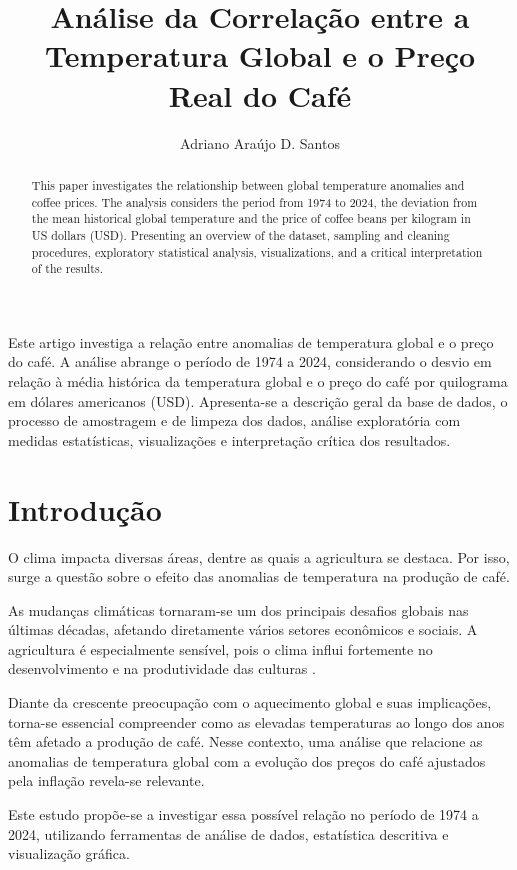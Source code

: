 \documentclass[12pt]{article}
\title{Análise da Correlação entre a Temperatura Global e o Preço Real do Café}
\author{Adriano Araújo D. Santos\inst{1}}
\begin{document}
 

\maketitle

\begin{abstract}
This paper investigates the relationship between global temperature anomalies and coffee prices. The analysis considers the period from 1974 to 2024, the deviation from the mean historical global temperature and the price of coffee beans per kilogram in US dollars (USD). Presenting an overview of the dataset, sampling and cleaning procedures, exploratory statistical analysis, visualizations, and a critical interpretation of the results.
\end{abstract}

\begin{resumo} 
Este artigo investiga a relação entre anomalias de temperatura global e o preço do café. A análise abrange o período de 1974 a 2024, considerando o desvio em relação à média histórica da temperatura global e o preço do café por quilograma em dólares americanos (USD). Apresenta-se a descrição geral da base de dados, o processo de amostragem e de limpeza dos dados, análise exploratória com medidas estatísticas, visualizações e interpretação crítica dos resultados.
\end{resumo}

\section{Introdução} \label{sec:introduction}
O clima impacta diversas áreas, dentre as quais a agricultura se destaca. Por isso, surge a questão sobre o efeito das anomalias de temperatura na produção de café.

As mudanças climáticas tornaram-se um dos principais desafios globais nas últimas décadas, afetando diretamente vários setores econômicos e sociais. A agricultura é especialmente sensível, pois o clima influi fortemente no desenvolvimento e na produtividade das culturas \cite{pinto:2004}.

Diante da crescente preocupação com o aquecimento global e suas implicações, torna-se essencial compreender como as elevadas temperaturas ao longo dos anos têm afetado a produção de café. Nesse contexto, uma análise que relacione as anomalias de temperatura global com a evolução dos preços do café ajustados pela inflação revela-se relevante.

Este estudo propõe-se a investigar essa possível relação no período de 1974 a 2024, utilizando ferramentas de análise de dados, estatística descritiva e visualização gráfica.
\end{document}
